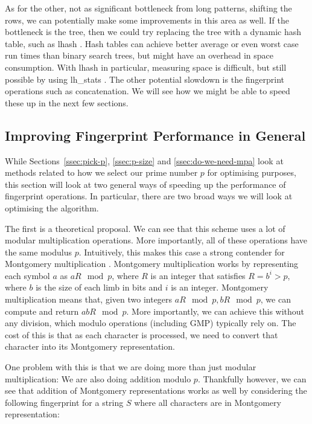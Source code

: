 \documentclass[ %
                    author={Dominic Joseph Moylett},
                    degree={MEng},
                     title={Dictionary Matching with Fingerprints},
                  subtitle={An Empirical Analysis},
                      type={research},
                      year={2015} ]{dissertation}
\begin{document}
As for the other, not as significant bottleneck from long patterns, shifting the rows, we can potentially make some improvements in this area as well. If the bottleneck is the tree, then we could try replacing the tree with a dynamic hash table, such as lhash \cite{website:openssl-lhash}. Hash tables can achieve better average or even worst case run times than binary search trees, but might have an overhead in space consumption. With lhash in particular, measuring space is difficult, but still possible by using lh\_stats \cite{website:openssl-lhstats}. The other potential slowdown is the fingerprint operations such as concatenation. We will see how we might be able to speed these up in the next few sections.

\subsection{Improving Fingerprint Performance in General}

While Sections~\ref{ssec:pick-p}, \ref{ssec:p-size} and \ref{ssec:do-we-need-mpa} look at methods related to how we select our prime number $p$ for optimising purposes, this section will look at two general ways of speeding up the performance of fingerprint operations. In particular, there are two broad ways we will look at optimising the algorithm.

The first is a theoretical proposal. We can see that this scheme uses a lot of modular multiplication operations. More importantly, all of these operations have the same modulus $p$. Intuitively, this makes this case a strong contender for Montgomery multiplication \cite{montgomery:multiplication}. Montgomery multiplication works by representing each symbol $a$ as $aR \mod p$, where $R$ is an integer that satisfies $R = b^i > p$, where $b$ is the size of each limb in bits and $i$ is an integer. Montgomery multiplication means that, given two integers $aR\mod p, bR\mod p$, we can compute and return $abR\mod p$. More importantly, we can achieve this without any division, which modulo operations (including GMP) typically rely on. The cost of this is that as each character is processed, we need to convert that character into its Montgomery representation.

One problem with this is that we are doing more than just modular multiplication: We are also doing addition modulo $p$. Thankfully however, we can see that addition of Montgomery representations works as well by considering the following fingerprint for a string $S$ where all characters are in Montgomery representation:
\end{document}
